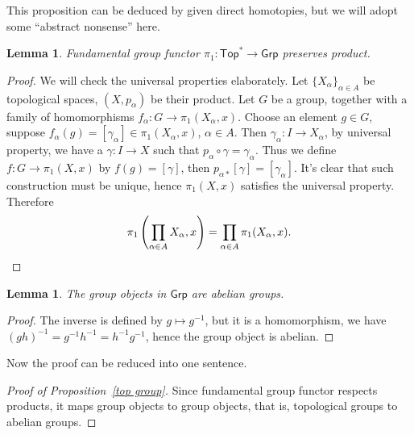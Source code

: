 \documentclass[a4paper]{amsart}
\theoremstyle{plain}
\newtheorem{lem}[thm]{Lemma}
\theoremstyle{definition}
\theoremstyle{remark}
\begin{document}
This proposition can be deduced by given direct homotopies, but we will adopt some ``abstract nonsense'' here.

\begin{lem}
    Fundamental group functor $\pi_1:\mathsf{Top}^*\to\mathsf{Grp}$ preserves product.
\end{lem}
\begin{proof}
    We will check the universal properties elaborately.
    Let $\{X_\alpha\}_{\alpha\in A}$ be topological spaces, $(X,p_\alpha)$ be their product.
    Let $G$ be a group, together with a family of homomorphisms $f_\alpha:G\to\pi_1(X_\alpha,x)$.
    Choose an element $g\in G$, suppose $f_\alpha(g)=[\gamma_\alpha]\in\pi_1(X_\alpha,x)$, $\alpha\in A$.
    Then $\gamma_\alpha:I\to X_\alpha$, by universal property, we have a $\gamma:I\to X$ such that $p_\alpha\circ\gamma=\gamma_\alpha$.
    Thus we define $f:G\to\pi_1(X,x)$ by $f(g)=[\gamma]$, then $p_{\alpha*}[\gamma]=[\gamma_\alpha]$.
    It's clear that such construction must be unique, hence $\pi_1(X,x)$ satisfies the universal property.
    Therefore
    \[\pi_1\left(\prod_{\alpha\in A}X_\alpha,x\right)=\prod_{\alpha\in A}\pi_1(X_\alpha,x).\qedhere\]
\end{proof}

\begin{lem}
    The group objects in $\mathsf{Grp}$ are abelian groups.
\end{lem}
\begin{proof}
    The inverse is defined by $g\mapsto g^{-1}$, but it is a homomorphism, we have $(gh)^{-1}=g^{-1}h^{-1}=h^{-1}g^{-1}$, hence the group object is abelian.
\end{proof}

Now the proof can be reduced into one sentence.
\begin{proof}[Proof of Proposition~\ref{top group}]
    Since fundamental group functor respects products, it maps group objects to group objects, that is, topological groups to abelian groups.
\end{proof}
\end{document}
